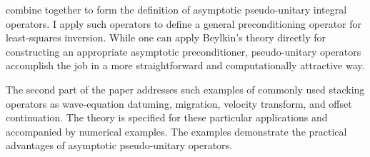 combine together to form the definition of asymptotic pseudo-unitary integral
operators. I apply such operators to define a general preconditioning operator
for least-squares inversion. While one can apply Beylkin's theory
  directly for constructing an appropriate asymptotic preconditioner,
  pseudo-unitary operators accomplish the job in a more straightforward and
  computationally attractive way.
\par
The second part of the paper addresses such examples of commonly used
stacking operators as wave-equation datuming, migration, velocity
transform, and offset continuation. The theory is specified for these
particular applications and accompanied by numerical examples. The
examples demonstrate the practical advantages of asymptotic
pseudo-unitary operators.


